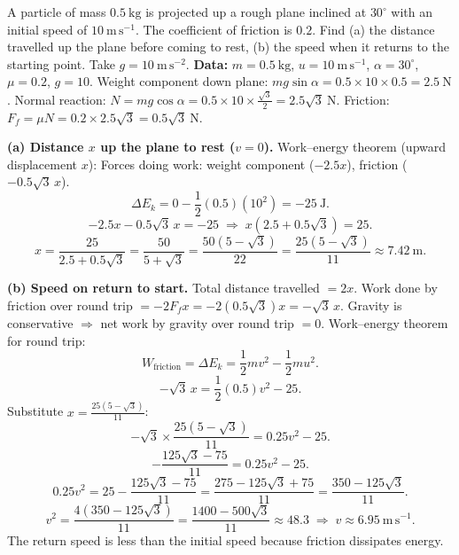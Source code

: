 \documentclass[11pt]{article}
\begin{document}
\begin{exoresolu}
A particle of mass $0.5\ \mathrm{kg}$ is projected up a rough plane inclined at $30^{\circ}$ with an initial speed of $10\ \mathrm{m\,s^{-1}}$. The coefficient of friction is $0.2$. Find (a) the distance travelled up the plane before coming to rest, (b) the speed when it returns to the starting point. Take $g = 10\ \mathrm{m\,s^{-2}}$.
\tcblower
\textbf{Data:} $m=0.5\ \mathrm{kg}$, $u=10\ \mathrm{m\,s^{-1}}$, $\alpha=30^{\circ}$, $\mu=0.2$, $g=10$.
Weight component down plane: $mg\sin\alpha = 0.5 \times 10 \times 0.5 = 2.5\ \mathrm{N}$.
Normal reaction: $N = mg\cos\alpha = 0.5 \times 10 \times \frac{\sqrt{3}}{2} = 2.5\sqrt{3}\ \mathrm{N}$.
Friction: $F_f = \mu N = 0.2 \times 2.5\sqrt{3} = 0.5\sqrt{3}\ \mathrm{N}$.

\textbf{(a) Distance $x$ up the plane to rest ($v=0$).}
Work–energy theorem (upward displacement $x$):
Forces doing work: weight component ($-2.5x$), friction ($-0.5\sqrt{3}\,x$).
\[
\Delta E_k = 0 - \frac{1}{2}(0.5)(10^2) = -25\ \mathrm{J}.
\]
\[
-2.5x - 0.5\sqrt{3}\,x = -25 \;\Longrightarrow\; x(2.5 + 0.5\sqrt{3}) = 25.
\]
\[
x = \frac{25}{2.5 + 0.5\sqrt{3}} = \frac{50}{5 + \sqrt{3}} = \frac{50(5-\sqrt{3})}{22} = \frac{25(5-\sqrt{3})}{11} \approx 7.42\ \mathrm{m}.
\]

\textbf{(b) Speed on return to start.}
Total distance travelled $= 2x$. Work done by friction over round trip $= -2F_f x = -2(0.5\sqrt{3})x = -\sqrt{3}\,x$.
Gravity is conservative $\Rightarrow$ net work by gravity over round trip $= 0$.
Work–energy theorem for round trip:
\[
W_{\text{friction}} = \Delta E_k = \frac{1}{2}mv^2 - \frac{1}{2}mu^2.
\]
\[
-\sqrt{3}\,x = \frac{1}{2}(0.5)v^2 - 25.
\]
Substitute $x = \frac{25(5-\sqrt{3})}{11}$:
\[
-\sqrt{3} \times \frac{25(5-\sqrt{3})}{11} = 0.25v^2 - 25.
\]
\[
-\frac{125\sqrt{3} - 75}{11} = 0.25v^2 - 25.
\]
\[
0.25v^2 = 25 - \frac{125\sqrt{3} - 75}{11} = \frac{275 - 125\sqrt{3} + 75}{11} = \frac{350 - 125\sqrt{3}}{11}.
\]
\[
v^2 = \frac{4(350 - 125\sqrt{3})}{11} = \frac{1400 - 500\sqrt{3}}{11} \approx 48.3 \;\Longrightarrow\; v \approx 6.95\ \mathrm{m\,s^{-1}}.
\]
The return speed is less than the initial speed because friction dissipates energy.
\end{exoresolu}
\end{document}
